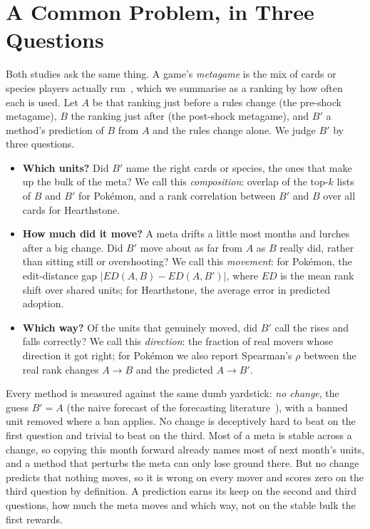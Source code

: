 \documentclass[journal]{IEEEtran}
\newcommand{\pkmn}{Pok\'emon}
\begin{document}
\section{A Common Problem, in Three Questions}
\label{sec:common}

Both studies ask the same thing. A game's \emph{metagame} is the mix of
cards or species players actually run~\cite{kokkinakis2021metagaming,silva2019evolving},
which we summarise as a ranking by how often each is used. Let $A$ be that ranking just before a rules change
(the pre-shock metagame), $B$ the ranking just after (the post-shock
metagame), and $B'$ a method's prediction of $B$ from $A$ and the rules
change alone. We judge $B'$ by three questions.

\begin{itemize}
\item \textbf{Which units?} Did $B'$ name the right cards or species, the
ones that make up the bulk of the meta? We call this \emph{composition}:
overlap of the top-$k$ lists of $B$ and $B'$ for \pkmn{}, and a rank
correlation between $B'$ and $B$ over all cards for Hearthstone.
\item \textbf{How much did it move?} A meta drifts a little most months and
lurches after a big change. Did $B'$ move about as far from $A$ as $B$ really
did, rather than sitting still or overshooting? We call this
\emph{movement}: for \pkmn{}, the edit-distance gap $|ED(A,B)-ED(A,B')|$,
where $ED$ is the mean rank shift over shared units; for Hearthstone, the
average error in predicted adoption.
\item \textbf{Which way?} Of the units that genuinely moved, did $B'$ call
the rises and falls correctly? We call this \emph{direction}: the fraction
of real movers whose direction it got right; for \pkmn{} we also report
Spearman's $\rho$ between the real rank changes $A{\to}B$ and the predicted
$A{\to}B'$.
\end{itemize}

Every method is measured against the same dumb yardstick: \emph{no change},
the guess $B'=A$ (the naive forecast of the forecasting
literature~\cite{hyndman2021fpp3}), with a banned unit removed where a ban
applies. No change is deceptively hard to beat on the
first question and trivial to beat on the third. Most of a meta is stable
across a change, so copying this month forward already names most of next
month's units, and a method that perturbs the meta can only lose ground
there. But no change predicts that nothing moves, so it is wrong on every
mover and scores zero on the third question by definition. A prediction earns
its keep on the second and third questions, how much the meta moves and which
way, not on the stable bulk the first rewards.
\end{document}

